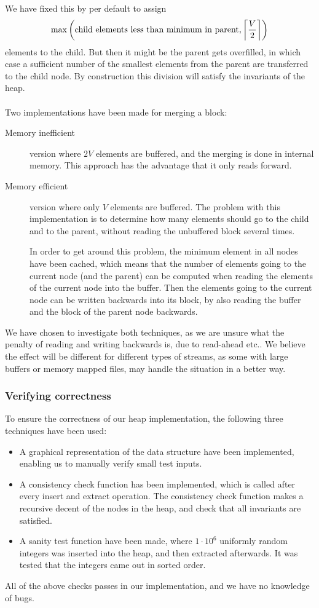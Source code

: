 We have fixed this by per default to assign
\[
  \max \left( \text{child elements less than minimum in parent}, \ceil*{\frac{V}{2}} \right)
\]
elements to the child. But then it might be the parent gets
overfilled, in which case a sufficient number of the smallest elements
from the parent are transferred to the child node. By construction
this division will satisfy the invariants of the heap.
\\
\\
Two implementations have been made for merging a block:
\begin{description}
\item[Memory inefficient] version where $2V$ elements are buffered,
  and the merging is done in internal memory. This approach has the
  advantage that it only reads forward.
\item[Memory efficient] version where only $V$ elements are
  buffered. The problem with this implementation is to determine how
  many elements should go to the child and to the parent, without
  reading the unbuffered block several times.

  In order to get around this problem, the minimum element in all
  nodes have been cached, which means that the number of elements
  going to the current node (and the parent) can be computed when
  reading the elements of the current node into the buffer. Then the
  elements going to the current node can be written backwards into its
  block, by also reading the buffer and the block of the parent node
  backwards.
\end{description}
We have chosen to investigate both techniques, as we are unsure what
the penalty of reading and writing backwards is, due to read-ahead
etc.. We believe the effect will be different for different types of
streams, as some with large buffers or memory mapped files, may handle
the situation in a better way.

\subsubsection{Verifying correctness}
To ensure the correctness of our heap implementation, the following
three techniques have been used:
\begin{itemize}
\item A graphical representation of the data structure have been
  implemented, enabling us to manually verify small test inputs.
\item A consistency check function has been implemented, which is
  called after every insert and extract operation. The consistency
  check function makes a recursive decent of the nodes in the heap,
  and check that all invariants are satisfied.
\item A sanity test function have been made, where $1\cdot 10^6$
  uniformly random integers was inserted into the heap, and then
  extracted afterwards. It was tested that the integers came out in
  sorted order.
\end{itemize}
All of the above checks passes in our implementation, and we have no
knowledge of bugs.


